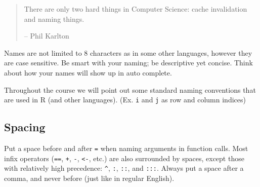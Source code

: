 \documentclass[]{book}
\newenvironment{Shaded}{\begin{snugshade}}{\end{snugshade}}
\newcommand{\CommentTok}[1]{\textcolor[rgb]{0.56,0.35,0.01}{\textit{#1}}}
\newcommand{\DecValTok}[1]{\textcolor[rgb]{0.00,0.00,0.81}{#1}}
\newcommand{\KeywordTok}[1]{\textcolor[rgb]{0.13,0.29,0.53}{\textbf{#1}}}
\newcommand{\NormalTok}[1]{#1}
\newcommand{\OperatorTok}[1]{\textcolor[rgb]{0.81,0.36,0.00}{\textbf{#1}}}
\newcommand{\StringTok}[1]{\textcolor[rgb]{0.31,0.60,0.02}{#1}}
\theoremstyle{definition}
\theoremstyle{definition}
\theoremstyle{definition}
\theoremstyle{remark}
\begin{document}
\begin{quote}
There are only two hard things in Computer Science: cache invalidation
and naming things.

-- Phil Karlton
\end{quote}

Names are not limited to 8 characters as in some other languages,
however they are case sensitive. Be smart with your naming; be
descriptive yet concise. Think about how your names will show up in auto
complete.

Throughout the course we will point out some standard naming conventions
that are used in R (and other languages). (Ex. \texttt{i} and \texttt{j}
as row and column indices)

\begin{Shaded}
\end{Shaded}

\hypertarget{spacing}{%
\subsection{Spacing}\label{spacing}}

Put a space before and after \texttt{=} when naming arguments in
function calls. Most infix operators (\texttt{==}, \texttt{+},
\texttt{-}, \texttt{\textless{}-}, etc.) are also surrounded by spaces,
except those with relatively high precedence: \texttt{\^{}}, \texttt{:},
\texttt{::}, and \texttt{:::}. Always put a space after a comma, and
never before (just like in regular English).
\end{document}
